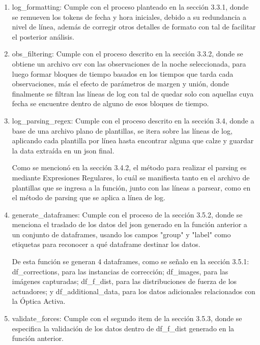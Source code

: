 \begin{enumerate}

    \item log\_formatting: Cumple con el proceso planteado en la sección 3.3.1, donde se remueven los tokens de fecha y hora iniciales, debido a su redundancia a nivel de línea, además de corregir otros detalles de formato con tal de facilitar el posterior análisis.

    \item obs\_filtering: Cumple con el proceso descrito en la sección 3.3.2, donde se obtiene un archivo csv con las observaciones de la noche seleccionada, para luego formar bloques de tiempo basados en los tiempos que tarda cada observaciones, más el efecto de parámetros de margen y unión, donde finalmente se filtran las líneas de log con tal de quedar solo con aquellas cuya fecha se encuentre dentro de alguno de esos bloques de tiempo.

    \item log\_parsing\_regex: Cumple con el proceso descrito en la sección 3.4, donde a base de una archivo plano de plantillas, se itera sobre las líneas de log, aplicando cada plantilla por línea hasta encontrar alguna que calze y guardar la data extraída en un json final.

    Como se mencionó en la sección 3.4.2, el método para realizar el parsing es mediante Expresiones Regulares, lo cuál se manifiesta tanto en el archivo de plantillas que se ingresa a la función, junto con las líneas a parsear, como en el método de parsing que se aplica a línea de log.

    \item generate\_dataframes: Cumple con el proceso de la sección 3.5.2, donde se menciona el traslado de los datos del json generado en la función anterior a un conjunto de dataframes, usando los campos "group" y "label" como etiquetas para reconocer a qué dataframe destinar los datos.

    De esta función se generan 4 dataframes, como se señalo en la sección 3.5.1: df\_corrections, para las instancias de corrección; df\_images, para las imágenes capturadas; df\_f\_dist, para las distribuciones de fuerza de los actuadores; y df\_additional\_data, para los datos adicionales relacionados con la Óptica Activa.

    \item validate\_forces: Cumple con el segundo item de la sección 3.5.3, donde se especifica la validación de los datos dentro de df\_f\_dist generado en la función anterior. 


\end{enumerate}
